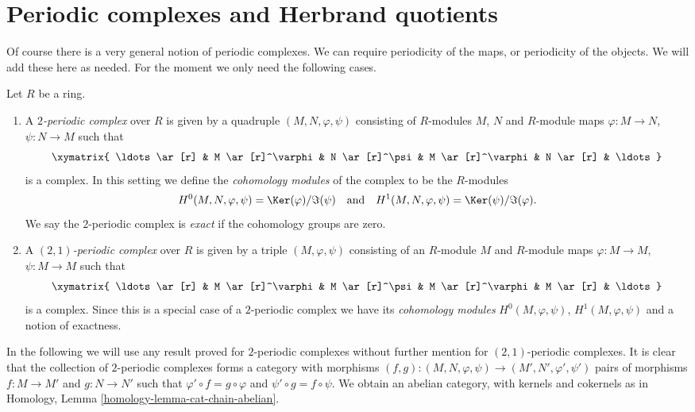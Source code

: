 \section{Periodic complexes and Herbrand quotients}
\label{section-periodic-complexes}

\noindent
Of course there is a very general notion of periodic complexes.
We can require periodicity of the maps, or periodicity of the objects.
We will add these here as needed. For the moment we only need
the following cases.

\begin{definition}
\label{definition-periodic-complex}
Let $R$ be a ring.
\begin{enumerate}
\item A {\it $2$-periodic complex} over $R$ is given
by a quadruple $(M, N, \varphi, \psi)$ consisting of
$R$-modules $M$, $N$ and $R$-module maps $\varphi : M \to N$,
$\psi : N \to M$ such that
$$
\xymatrix{
\ldots \ar[r] &
M \ar[r]^\varphi &
N \ar[r]^\psi &
M \ar[r]^\varphi &
N \ar[r] & \ldots
}
$$
is a complex. In this setting we define the {\it cohomology modules}
of the complex to be the $R$-modules
$$
H^0(M, N, \varphi, \psi) = \Ker(\varphi)/\Im(\psi)
\quad\text{and}\quad
H^1(M, N, \varphi, \psi) = \Ker(\psi)/\Im(\varphi).
$$
We say the $2$-periodic complex is {\it exact} if the cohomology
groups are zero.
\item A {\it $(2, 1)$-periodic complex} over $R$ is given
by a triple $(M, \varphi, \psi)$ consisting of an $R$-module $M$ and
$R$-module maps $\varphi : M \to M$, $\psi : M \to M$
such that
$$
\xymatrix{
\ldots \ar[r] &
M \ar[r]^\varphi &
M \ar[r]^\psi &
M \ar[r]^\varphi &
M \ar[r] & \ldots
}
$$
is a complex. Since this is a special case of a $2$-periodic complex
we have its {\it cohomology modules} $H^0(M, \varphi, \psi)$,
$H^1(M, \varphi, \psi)$ and a notion of exactness.
\end{enumerate}
\end{definition}

\noindent
In the following we will use any result proved for $2$-periodic
complexes without further mention for $(2, 1)$-periodic complexes.
It is clear that the collection of $2$-periodic complexes forms a
category with morphisms
$(f, g) : (M, N, \varphi, \psi) \to (M', N', \varphi', \psi')$
pairs of morphisms $f : M \to M'$ and $g : N \to N'$ such
that $\varphi' \circ f = g \circ \varphi$ and $\psi' \circ g = f \circ \psi$.
We obtain an abelian category, with kernels and cokernels as in
Homology, Lemma \ref{homology-lemma-cat-chain-abelian}.

